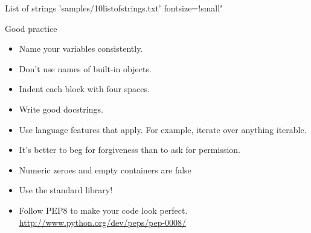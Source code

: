 \documentclass{pyslides}
\begin{document}
\begin{frame}[fragile]{List of strings}
 'samples/10listofstrings.txt' fontsize=!small"
\end{frame}

\begin{frame}[fragile]{Good practice}
\begin{itemize}
\item Name your variables consistently.
\item Don't use names of built-in objects.
\item Indent each block with four spaces.
\item Write good docstrings.
\item Use language features that apply. For example, iterate over anything iterable.
\item It's better to beg for forgiveness than to ask for permission.
\item Numeric zeroes and empty containers are false
\item Use the standard library!
\item Follow PEP8 to make your code look perfect.
\\\url{http://www.python.org/dev/peps/pep-0008/}
\end{itemize}

\end{frame}
\end{document}
